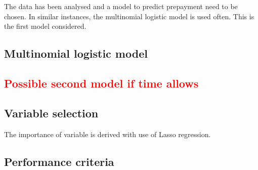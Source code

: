 The data has been analysed and a model to predict prepayment need to be chosen. In similar instances, the multinomial logistic model is used often. This is the first model considered.

\subsection{Multinomial logistic model}


\textcolor{red}{\subsection{Possible second model if time allows}}


\subsection{Variable selection}
The importance of variable is derived with use of Lasso regression. 

\subsection{Performance criteria}
